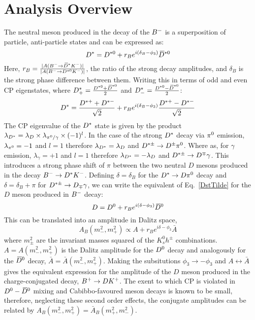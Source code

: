 \section{Analysis Overview}
The neutral \Dstar meson produced in the decay of the ${{{B}^-}}$ is a superposition of particle, anti-particle states and can be expressed as:
  \begin{equation}
    {\ensuremath{{D}^*}}={{D}^{*0}}+r_Be^{i(\delta_B-\phi_3)}{{\kern 0.2em\overline{\kern -0.2em D}{}}{}^{*0}}
    \label{DstTilde}
  \end{equation}
  Here, $r_B=\frac{|A({{{B}^-}}\rightarrow {\ensuremath{{\kern 0.2em\overline{\kern -0.2em D}{}}{}^*}}{\ensuremath{{K}^-}})|}{|A(B^{-}\rightarrow {\ensuremath{{D}^{*0}}}{\ensuremath{{K}^-}})|}$, the ratio of the strong decay amplitudes, and $\delta_B$ is the strong phase difference between them.
  Writing this in terms of odd and even CP eigenstates, where $D^{*}_{+}=\frac{{{D}^{*0}}+{{\kern 0.2em\overline{\kern -0.2em D}{}}}^{*0}}{2}$ and $D^{*}_{-}=\frac{{{D}^{*0}}-{{\kern 0.2em\overline{\kern -0.2em D}{}}}^{*0}}{2}$:
  \begin{equation}
    {\ensuremath{{D}^*}}=\frac{{{D}^{*+}}+{{D}^{*-}}}{\sqrt{2}}+r_Be^{i(\delta_B-\phi_3)}\frac{{{D}^{*+}}-{{D}^{*-}}}{\sqrt{2}}
    \label{DstTildeCP}
  \end{equation}
  The CP eigenvalue of the ${{D}^*}$ state is given by the product $\lambda_{{{D}^*}}=\lambda_D\times \lambda_{{{\pi}^0}\text{/}\gamma} \times(-1)^l$. In the case of the strong ${{D}^*}$ decay via ${{\pi}^0}$ emission, $\lambda_{{{\pi}^0}}=-1$ and $l=1$ therefore $\lambda_{{{D}^*}}=\lambda_D$ and ${{D}^{*\pm}}\rightarrow {\ensuremath{{D}^\pm}}{\ensuremath{{\pi}^0}}$. Where as, for $\gamma$ emission, $\lambda_{\gamma}=+1$ and $l=1$ therefore $\lambda_{{{D}^*}}=-\lambda_D$ and ${{D}^{*\pm}}\rightarrow {\ensuremath{{D}^\mp}}\gamma$. This introduces a
  strong phase shift of $\pi$ between the two neutral $D$ mesons produced in the decay ${{{B}^-}}\rightarrow D^*{{K}^-}$. Defining $\delta=\delta_B$ for the $D^*\rightarrow D{{\pi}^0}$ decay and $\delta=\delta_B+\pi$ for ${{D}^{*\pm}}\rightarrow D_{\mp}\gamma$, we can write the equivalent of Eq.~\eqref{DstTilde} for the $D$ meson produced in ${{{B}^-}}$ decay:
  \begin{equation}
    D={{D}^0}+r_Be^{i(\delta-\phi_3)}{{\kern 0.2em\overline{\kern -0.2em D}{}}{}^0}
    \label{DTilde}
  \end{equation}
  This can be translated into an amplitude in Dalitz space,
  \begin{equation}
    A_B(m_-^2,m_+^2) \propto A + r_Be^{i\delta-\phi_3}\bar{A}
    \label{eq:amplitude}
  \end{equation}
  where $m_{\pm}^2$ are the invariant masses squared of the $K^0_sh^{\pm}$ combinations. $A=A(m_-^2,m_+^2)$ is the Dalitz amplitude for the ${{D}^0}$ decay and analogously for the ${{\kern 0.2em\overline{\kern -0.2em D}{}}{}^0}$ decay, $\bar{A}=\bar{A}(m_-^2,m_+^2)$. Making the subsitutions $\phi_3\rightarrow -\phi_3$ and $A\leftrightarrow \bar{A}$ gives the equivalent expression for the amplitude of the $D$ meson produced in the charge-conjugated decay, ${{{B}^+}}\rightarrow D{{K}^+}$. The exent to which CP is violated in
  ${{D}^0}-{{\kern 0.2em\overline{\kern -0.2em D}{}}{}^0}$ mixing and Cabibbo-favoured \D meson decays is known to be small, therefore, neglecting these second order effects, the conjugate amplitudes can be related by $A_B(m_-^2,m_+^2)=\bar{A}_B(m_+^2,m_-^2)$.

